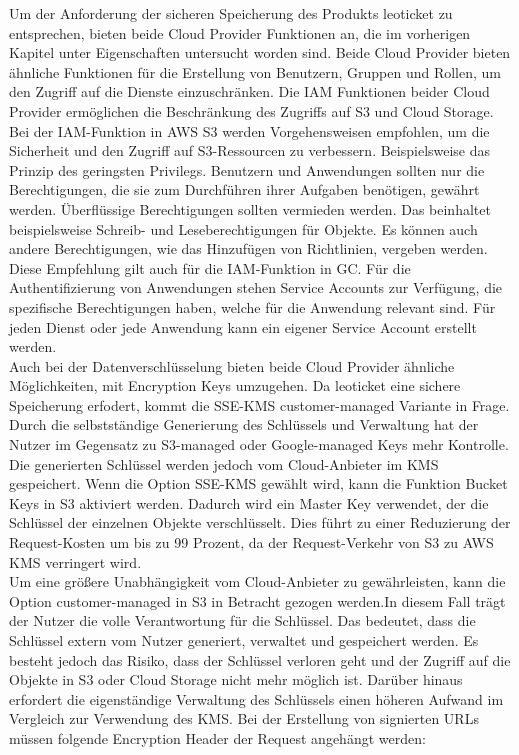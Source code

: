 Um der Anforderung der sicheren Speicherung des Produkts leoticket zu entsprechen, bieten beide Cloud Provider Funktionen an, die im vorherigen Kapitel unter Eigenschaften untersucht worden sind. Beide Cloud Provider bieten ähnliche Funktionen für die Erstellung von Benutzern, Gruppen und Rollen, um den Zugriff auf die Dienste einzuschränken. Die IAM Funktionen beider Cloud Provider ermöglichen die Beschränkung des Zugriffs auf S3 und Cloud Storage. Bei der IAM-Funktion in AWS S3 werden Vorgehensweisen empfohlen, um die Sicherheit und den Zugriff auf S3-Ressourcen zu verbessern. Beispielsweise das Prinzip des geringsten Privilegs. Benutzern und Anwendungen sollten nur die Berechtigungen, die sie zum Durchführen ihrer Aufgaben benötigen, gewährt werden. Überflüssige Berechtigungen sollten vermieden werden. Das beinhaltet beispielsweise Schreib- und Leseberechtigungen für Objekte. Es können auch andere Berechtigungen, wie das Hinzufügen von Richtlinien, vergeben werden. Diese Empfehlung gilt auch für die IAM-Funktion in GC. Für die Authentifizierung von Anwendungen stehen Service Accounts zur Verfügung, die spezifische Berechtigungen haben, welche für die Anwendung relevant sind. Für jeden Dienst oder jede Anwendung kann ein eigener Service Account erstellt werden.\\

Auch bei der Datenverschlüsselung bieten beide Cloud Provider ähnliche Möglichkeiten, mit Encryption Keys umzugehen. Da leoticket eine sichere Speicherung erfodert, kommt die SSE-KMS customer-managed Variante in Frage. Durch die selbstständige Generierung des Schlüssels und Verwaltung hat der Nutzer im Gegensatz zu S3-managed oder Google-managed Keys mehr Kontrolle. Die generierten Schlüssel werden jedoch vom Cloud-Anbieter im KMS gespeichert. Wenn die Option SSE-KMS gewählt wird, kann die Funktion Bucket Keys in S3 aktiviert werden. Dadurch wird ein Master Key verwendet, der die Schlüssel der einzelnen Objekte verschlüsselt. Dies führt zu einer Reduzierung der Request-Kosten um bis zu 99 Prozent, da der Request-Verkehr von S3 zu AWS KMS verringert wird.\\

Um eine größere Unabhängigkeit vom Cloud-Anbieter zu gewährleisten, kann die Option customer-managed in S3 in Betracht gezogen werden.In diesem Fall trägt der Nutzer die volle Verantwortung für die Schlüssel. Das bedeutet, dass die Schlüssel extern vom Nutzer generiert, verwaltet und gespeichert werden. Es besteht jedoch das Risiko, dass der Schlüssel verloren geht und der Zugriff auf die Objekte in S3 oder Cloud Storage nicht mehr möglich ist. Darüber hinaus erfordert die eigenständige Verwaltung des Schlüssels einen höheren Aufwand im Vergleich zur Verwendung des KMS. Bei der Erstellung von signierten URLs müssen folgende Encryption Header der Request angehängt werden: 

